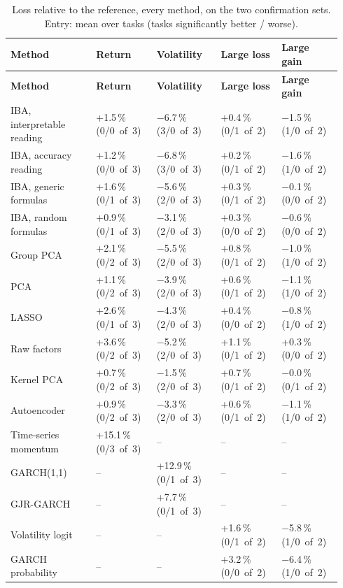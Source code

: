 {\scriptsize\setlength{\tabcolsep}{4pt}\renewcommand{\arraystretch}{1.2}
\begin{longtable}{@{}>{\raggedright\arraybackslash}p{0.243\linewidth}>{\raggedright\arraybackslash}p{0.179\linewidth}>{\raggedright\arraybackslash}p{0.180\linewidth}>{\raggedright\arraybackslash}p{0.171\linewidth}>{\raggedright\arraybackslash}p{0.171\linewidth}@{}}
\caption{Loss relative to the reference, every method, on the two confirmation sets. Entry: mean over tasks (tasks significantly better / worse).}\label{tab:E1}\\
\toprule
\textbf{Method} & \textbf{Return} & \textbf{Volatility} & \textbf{Large loss} & \textbf{Large gain} \\
\midrule
\endfirsthead
\toprule
\textbf{Method} & \textbf{Return} & \textbf{Volatility} & \textbf{Large loss} & \textbf{Large gain} \\
\midrule
\endhead
\bottomrule
\endlastfoot
IBA, interpretable reading & +1.5\,\% (0/0~of~3) & \ensuremath{-}6.7\,\% (3/0~of~3) & +0.4\,\% (0/1~of~2) & \ensuremath{-}1.5\,\% (1/0~of~2) \\
IBA, accuracy reading & +1.2\,\% (0/0~of~3) & \ensuremath{-}6.8\,\% (3/0~of~3) & +0.2\,\% (0/1~of~2) & \ensuremath{-}1.6\,\% (1/0~of~2) \\
IBA, generic formulas & +1.6\,\% (0/1~of~3) & \ensuremath{-}5.6\,\% (2/0~of~3) & +0.3\,\% (0/1~of~2) & \ensuremath{-}0.1\,\% (0/0~of~2) \\
IBA, random formulas & +0.9\,\% (0/1~of~3) & \ensuremath{-}3.1\,\% (2/0~of~3) & +0.3\,\% (0/0~of~2) & \ensuremath{-}0.6\,\% (0/0~of~2) \\
Group PCA & +2.1\,\% (0/2~of~3) & \ensuremath{-}5.5\,\% (2/0~of~3) & +0.8\,\% (0/1~of~2) & \ensuremath{-}1.0\,\% (1/0~of~2) \\
PCA & +1.1\,\% (0/2~of~3) & \ensuremath{-}3.9\,\% (2/0~of~3) & +0.6\,\% (0/1~of~2) & \ensuremath{-}1.1\,\% (1/0~of~2) \\
LASSO & +2.6\,\% (0/1~of~3) & \ensuremath{-}4.3\,\% (2/0~of~3) & +0.4\,\% (0/0~of~2) & \ensuremath{-}0.8\,\% (1/0~of~2) \\
Raw factors & +3.6\,\% (0/2~of~3) & \ensuremath{-}5.2\,\% (2/0~of~3) & +1.1\,\% (0/1~of~2) & +0.3\,\% (0/0~of~2) \\
Kernel PCA & +0.7\,\% (0/2~of~3) & \ensuremath{-}1.5\,\% (2/0~of~3) & +0.7\,\% (0/1~of~2) & \ensuremath{-}0.0\,\% (0/1~of~2) \\
Autoencoder & +0.9\,\% (0/2~of~3) & \ensuremath{-}3.3\,\% (2/0~of~3) & +0.6\,\% (0/1~of~2) & \ensuremath{-}1.1\,\% (1/0~of~2) \\
Time-series momentum & +15.1\,\% (0/3~of~3) & -- & -- & -- \\
GARCH(1,1) & -- & +12.9\,\% (0/1~of~3) & -- & -- \\
GJR-GARCH & -- & +7.7\,\% (0/1~of~3) & -- & -- \\
Volatility logit & -- & -- & +1.6\,\% (0/1~of~2) & \ensuremath{-}5.8\,\% (1/0~of~2) \\
GARCH probability & -- & -- & +3.2\,\% (0/0~of~2) & \ensuremath{-}6.4\,\% (1/0~of~2) \\
\end{longtable}}

